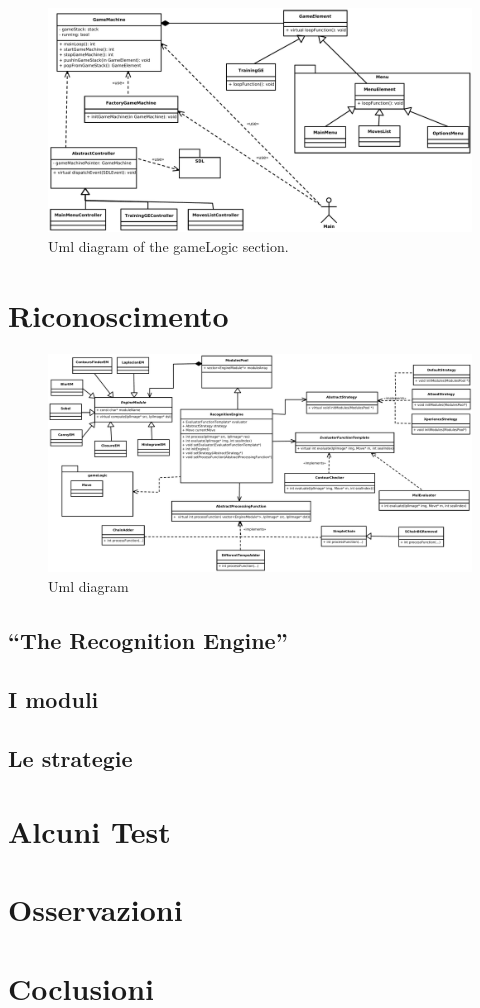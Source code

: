 \documentclass[a4paper,10pt, twocolumn]{article}
\begin{document}
  \begin{figure}
  \centering
    \includegraphics[scale=0.4]{UmlDiagrams/gameStack.pdf}
    \caption{Uml diagram of the gameLogic section.}
  \label{gameStackDiagram}     
  
  \end{figure}

\section{Riconoscimento}
\clearpage
  \begin{figure}     
     \centering
    \includegraphics[angle=90, scale=0.4]{UmlDiagrams/recognitionEngine.pdf}
    \caption{Uml diagram}
    \label{recognitionEngineDiagram}
  \end{figure}


  \subsection{``The Recognition Engine''}
  \subsection{I moduli}
  \subsection{Le strategie}
 
\section{Alcuni Test}

\section{Osservazioni}

\section{Coclusioni}


\clearpage

\nocite{*}



\end{document}
